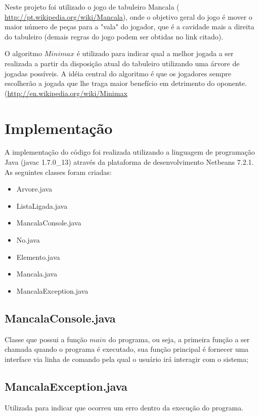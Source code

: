 \documentclass[a4paper,11pt]{article}
\begin{document}
Neste projeto foi utilizado o jogo de tabuleiro Mancala (\hyperlink{http://pt.wikipedia.org/wiki/Mancala}{ http://pt.wikipedia.org/wiki/Mancala}), onde o objetivo geral do jogo é mover o maior número de peças para a "vala" do jogador, que é a cavidade mais a direita do tabuleiro (demais regras do jogo podem ser obtidas no link citado).

O algoritmo $Minimax$ é utilizado para indicar qual a melhor jogada a ser realizada a partir da disposição atual do tabuleiro utilizando uma árvore de jogadas possíveis. A idéia central do algoritmo é que os jogadores sempre escolherão a jogada que lhe traga maior benefício em detrimento do oponente. (\hyperlink{http://en.wikipedia.org/wiki/Minimax}{http://en.wikipedia.org/wiki/Minimax}

\section{Implementação}
A implementação do código foi realizada utilizando a linguagem de programação Java (javac 1.7.0\_13) através da plataforma de desenvolvimento Netbeans 7.2.1.\\

As seguintes classes foram criadas:
\begin{itemize}
  \item Arvore.java   
  \item ListaLigada.java
  \item MancalaConsole.java
  \item No.java
  \item Elemento.java
  \item Mancala.java
  \item MancalaException.java
\end{itemize}

\subsection{MancalaConsole.java}
Classe que possui a função $main$ do programa, ou seja, a primeira função a ser chamada quando o programa é executado, sua função principal é fornecer uma interface via linha de comando pela qual o usuário irá interagir com o sistema;

\subsection{MancalaException.java}
Utilizada para indicar que ocorreu um erro dentro da execução do programa.
\end{document}
